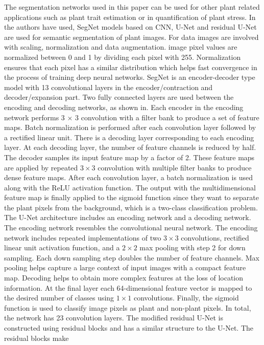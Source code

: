 The segmentation networks used in this paper can be used for other plant related applications such as plant trait estimation or in quantification of plant stress.
In \cite{KOLHAR2021101373} the authors have used, SegNet models based on CNN, U-Net and residual U-Net are used for semantic segmentation of plant images. For data images are involved
with scaling, normalization and data augmentation. image pixel values are normalized between 0 and 1 by dividing each pixel with 255. Normalization ensures that each pixel
has a similar distribution which helps fast convergence in the process of training deep neural networks. SegNet is an encoder-decoder type model with 13 convolutional
layers in the encoder/contraction and decoder/expansion part. Two fully connected layers are used between the encoding and decoding networks, as shown in. Each encoder
in the encoding network performs 3 × 3 convolution with a filter bank to produce a set of feature maps. Batch normalization is performed after each convolution layer
followed by a rectified linear unit. There is a decoding layer corresponding to each encoding layer. At each decoding layer, the number of feature channels is reduced
by half. The decoder samples its input feature map by a factor of 2. These feature maps are applied by repeated $3 \times 3$ convolution with multiple filter banks to produce
dense feature maps. After each convolution layer, a batch normalization is used along with the ReLU activation function. The output with the multidimensional feature
map is finally applied to the sigmoid function since they want to separate the plant pixels from the background, which is a two-class classification problem. The U-Net
architecture includes an encoding network and a decoding network. The encoding network resembles the convolutional neural network. The encoding network includes
repeated implementations of two $3 \times 3$ convolutions, rectified linear unit activation function, and a $2 \times 2$ max pooling with step
2 for down sampling. Each down sampling step doubles the number of feature channels. Max pooling helps capture a large context of input images with a
compact feature map. Decoding helps to obtain more complex features at the loss of location information. At the final layer each 64-dimensional feature vector is mapped
to the desired number of classes using $1 \times 1$ convolutions. Finally, the sigmoid function is used to classify image pixels as plant and non-plant pixels. In total, the
network has 23 convolution layers. The modified residual U-Net is constructed using residual blocks and has a similar structure to the U-Net. The residual blocks make

